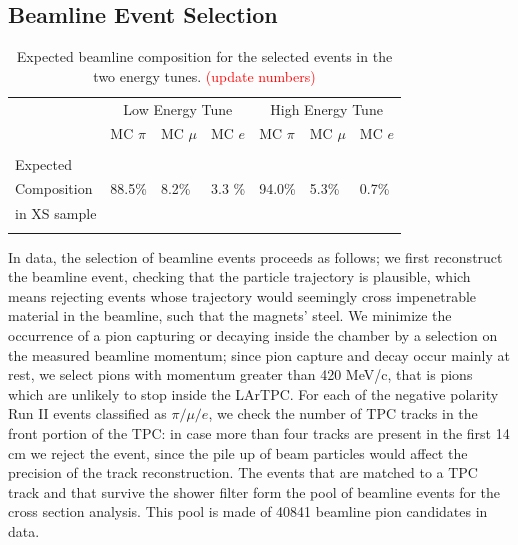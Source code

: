 \documentclass[aps,prl,twocolumn,showpacs,superscriptaddress,groupedaddress]{revtex4}  %
\begin{document}
\subsection{\label{sec:EventSelection}Beamline Event Selection}
\begin{table}
\caption{\label{tab:MCafterCutContaminants}Expected beamline composition for the selected events in the two energy tunes. \textcolor{red}{(update numbers)}}
\begin{ruledtabular}
\begin{tabular}{ l | l | l | l | l | l | l  |}
 &  \multicolumn{3}{c|}{Low Energy Tune} & \multicolumn{3}{c|}{High Energy Tune }\\
& MC $\pi$   & MC  $ \mu$ & MC  $e$ & MC  $\pi$ & MC  $\mu$ & MC  $e$  \\
\hline
&  &  &  & & &\\  
Expected &  &  &  & & &\\  
Composition&  88.5\%   & 8.2\%   & 3.3 \%   & 94.0\%	& 5.3\% & 0.7\%\\
in XS sample               &                      &                       &                   &                       &                        &\\  
&                      &                       &                   &                       &                        &\\  
\end{tabular}
\end{ruledtabular}
\end{table}

In data, the selection of beamline events proceeds as follows; we first reconstruct the beamline event, checking that the particle trajectory is plausible, which means rejecting events whose trajectory would seemingly  cross impenetrable material in the beamline, such that the magnets' steel. We minimize the occurrence of a pion capturing or decaying inside the chamber by a selection on the measured  beamline momentum; since pion capture and decay occur mainly at rest,  we select pions with momentum greater than 420 MeV/c, that is pions which are unlikely to stop inside the LArTPC.
For each of the negative polarity Run II events classified as $\pi/\mu/e$, we check the number of TPC tracks in the front portion of the TPC: in case more than four tracks are present in the first 14 cm we reject the event,  since the pile up of beam particles would affect the precision of the track reconstruction. The events that are matched to a TPC track and that survive the shower filter form the pool of beamline events for the cross section analysis. This pool is made of 40841 beamline pion candidates in data. 
\end{document}
